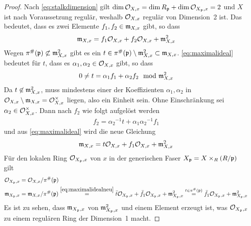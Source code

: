 \begin{Lemma}
\begin{proof}
    Nach \autoref{eq:stalkdimension} gilt
    $\dim\mathcal{O}_{X,x}=\dim R_{\mathfrak{p}}+\dim\mathcal{O}_{X_{\mathfrak{p}},x}=2$ und $X$ ist nach
    Voraussetzung regulär, weshalb $\mathcal{O}_{X,x}$ regulär von Dimension~2
    ist. Das bedeutet, dass es zwei Elemente $f_1, f_2\in\mathfrak{m}_{X,x}$
    gibt, so dass
    \begin{gather}\label{eq:maximalideal}
      \mathfrak{m}_{X,x} = f_1\mathcal{O}_{X,x} + f_2\mathcal{O}_{X,x} + \mathfrak{m}_{X,x}^2
    \end{gather}
    Wegen $\pi^\#(\mathfrak{p})\not\subset\mathfrak{m}_{X,x}^2$ gibt es ein
    $t\in\pi^\#(\mathfrak{p})\setminus\mathfrak{m}_{X,x}^2\subset\mathfrak{m}_{X,x}$.
    \eqref{eq:maximalideal} bedeutet für $t$, dass es $\alpha_1,
    \alpha_2\in\mathcal{O}_{X,x}$ gibt, so dass
    \begin{gather*}
      0 \neq t = \alpha_1 f_1 + \alpha_2 f_2 \mod {\mathfrak{m}}_{X,x}^2
    \end{gather*}
    Da $t\not\in\mathfrak{m}_{X,x}^2$, muss mindestens einer der Koeffizienten
    $\alpha_1,\alpha_2$ in $\mathcal{O}_{X,x}\setminus\mathfrak{m}_{X,x}=\mathcal{O}_{X,x}^\times$
    liegen, also ein Einheit sein. Ohne Einschränkung sei
    $\alpha_2\in\mathcal{O}_{X,x}^\times$. Dann nach $f_2$ wie folgt
    aufgelöst werden
    \begin{gather*}
      f_2 = {\alpha_2}^{-1}t + {\alpha_1}{\alpha_2}^{-1}f_1 
    \end{gather*}
    und aus \eqref{eq:maximalideal} wird die neue Gleichung
    \begin{gather}\label{eq:maximalidealneu}
      \mathfrak{m}_{X,x} = t\mathcal{O}_{X,x} + f_1\mathcal{O}_{X,x} + \mathfrak{m}_{X,x}^2
    \end{gather}
    Für den lokalen Ring $\mathcal{O}_{X_{\mathfrak{p}},x}$ von $x$ in der generischen
    Faser $X_{\mathfrak{p}} = X\times_R (R/\mathfrak{p})$ gilt
    \begin{align*}
      \mathcal{O}_{X_{\mathfrak{p}},x} &= \mathcal{O}_{X,x}/\pi^\#(\mathfrak{p})\\
      \mathfrak{m}_{X_{\mathfrak{p}},x} &= \mathfrak{m}_{X,x}/\pi^\#(\mathfrak{p})
                    \overset{\eqref{eq:maximalidealneu}}{=}
                    \bar t\mathcal{O}_{X_{\mathfrak{p}},x} + \bar f_1\mathcal{O}_{X_{\mathfrak{p}},x} +
                    \mathfrak{m}_{X_{\mathfrak{p}},x}^2
                    \overset{t\in\pi^\#(\mathfrak{p})}{=}
                    \bar f_1\mathcal{O}_{X_{\mathfrak{p}},x} + \mathfrak{m}_{X_{\mathfrak{p}},x}^2 
    \end{align*}
    Es ist zu sehen, dass $\mathfrak{m}_{X_{\mathfrak{p}},x}$ von $\mathfrak{m}_{X_{\mathfrak{p}},x}^2$ und einem Element
    erzeugt ist, was $\mathcal{O}_{X_{\mathfrak{p}},x}$ zu einem regulären Ring der Dimension~1
    macht.
  \end{proof}
\end{Lemma}

